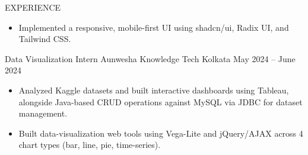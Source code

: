 \documentclass{resume} %
\begin{document}
\begin{rSection}{EXPERIENCE}
\begin{itemize}
    \item Implemented a responsive, mobile-first UI using shadcn/ui, Radix UI, and Tailwind CSS.

\end{itemize}

\experienceHeading
{Data Visualization Intern}
{Aunwesha Knowledge Tech}
{Kolkata}
{May 2024 -- June 2024}

\begin{itemize}
    \itemsep -3pt {}

    \item Analyzed Kaggle datasets and built interactive dashboards using Tableau, alongside Java-based CRUD operations against MySQL via JDBC for dataset management.

    \item Built data-visualization web tools using Vega-Lite and jQuery/AJAX across 4 chart types (bar, line, pie, time-series).

\end{itemize}

\end{rSection}

\vspace{-2pt}

\end{document}
